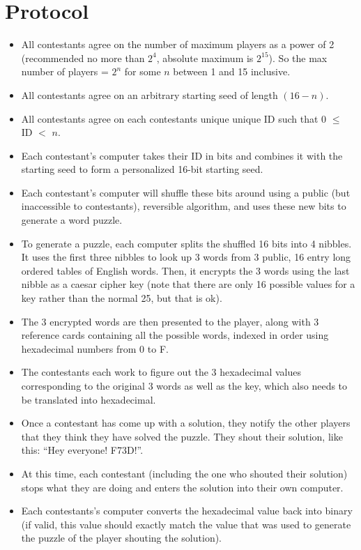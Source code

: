 \documentclass[leqno,12pt]{article}
\begin{document}
\section{Protocol}
\begin{itemize}
\item All contestants agree on the number of maximum players as a power of 2 (recommended no more than $2^4$, absolute maximum is $2^{15}$). So the max number of players = $2^n$ for some $n$ between 1 and 15 inclusive.
\item All contestants agree on an arbitrary starting seed of length $(16 - n)$.
\item All contestants agree on each contestants unique unique ID such that 0 $\leq$ ID $<$ $n$.
\item Each contestant’s computer takes their ID in bits and combines it with the starting seed to form a personalized 16-bit starting seed.
\item Each contestant’s computer will shuffle these bits around using a public (but inaccessible to contestants), reversible algorithm, and uses these new bits to generate a word puzzle.
\item To generate a puzzle, each computer splits the shuffled 16 bits into 4 nibbles. It uses the first three nibbles to look up 3 words from 3 public, 16 entry long ordered tables of English words. Then, it encrypts the 3 words using the last nibble as a caesar cipher key (note that there are only 16 possible values for a key rather than the normal 25, but that is ok).
\item The 3 encrypted words are then presented to the player, along with 3 reference cards containing all the possible words, indexed in order using hexadecimal numbers from 0 to F.
\item The contestants each work to figure out the 3 hexadecimal values corresponding to the original 3 words as well as the key, which also needs to be translated into hexadecimal.
\item Once a contestant has come up with a solution, they notify the other players that they think they have solved the puzzle. They shout their solution, like this: “Hey everyone! F73D!”.
\item At this time, each contestant (including the one who shouted their solution) stops what they are doing and enters the solution into their own computer.
\item Each contestants’s computer converts the hexadecimal value back into binary (if valid, this value should exactly match the value that was used to generate the puzzle of the player shouting the solution).

\end{itemize}
\end{document}
